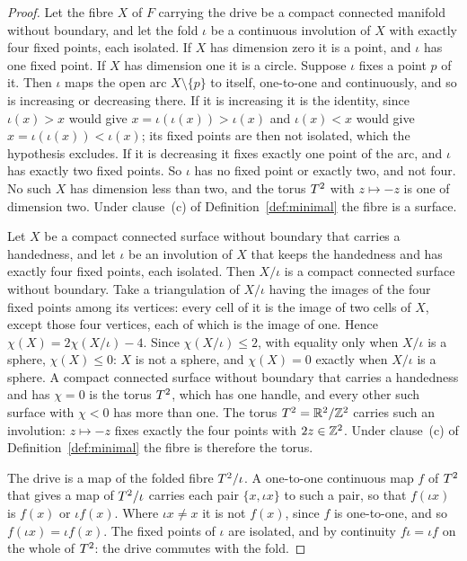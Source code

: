 \documentclass[11pt,a4paper]{article}
\theoremstyle{plain}
\theoremstyle{definition}
\theoremstyle{remark}
\begin{document}
\begin{proof}
Let the fibre $X$ of $F$ carrying the drive be a compact connected manifold without boundary, and let the fold $\iota$ be a continuous involution of $X$ with exactly four fixed points, each isolated. If $X$ has dimension zero it is a point, and $\iota$ has one fixed point. If $X$ has dimension one it is a circle. Suppose $\iota$ fixes a point $p$ of it. Then $\iota$ maps the open arc $X\setminus\{p\}$ to itself, one-to-one and continuously, and so is increasing or decreasing there. If it is increasing it is the identity, since $\iota(x)>x$ would give $x=\iota(\iota(x))>\iota(x)$ and $\iota(x)<x$ would give $x=\iota(\iota(x))<\iota(x)$; its fixed points are then not isolated, which the hypothesis excludes. If it is decreasing it fixes exactly one point of the arc, and $\iota$ has exactly two fixed points. So $\iota$ has no fixed point or exactly two, and not four. No such $X$ has dimension less than two, and the torus $T^2$ with $z\mapsto-z$ is one of dimension two. Under clause~(c) of Definition~\ref{def:minimal} the fibre is a surface.

Let $X$ be a compact connected surface without boundary that carries a handedness, and let $\iota$ be an involution of $X$ that keeps the handedness and has exactly four fixed points, each isolated. Then $X/\iota$ is a compact connected surface without boundary. Take a triangulation of $X/\iota$ having the images of the four fixed points among its vertices: every cell of it is the image of two cells of $X$, except those four vertices, each of which is the image of one. Hence $\chi(X)=2\chi(X/\iota)-4$. Since $\chi(X/\iota)\le2$, with equality only when $X/\iota$ is a sphere, $\chi(X)\le0$: $X$ is not a sphere, and $\chi(X)=0$ exactly when $X/\iota$ is a sphere. A compact connected surface without boundary that carries a handedness and has $\chi=0$ is the torus $T^2$, which has one handle, and every other such surface with $\chi<0$ has more than one. The torus $T^2=\mathbb{R}^{2}/\mathbb{Z}^{2}$ carries such an involution: $z\mapsto-z$ fixes exactly the four points with $2z\in\mathbb{Z}^{2}$. Under clause~(c) of Definition~\ref{def:minimal} the fibre is therefore the torus.

The drive is a map of the folded fibre $T^2/\iota$. A one-to-one continuous map $f$ of $T^2$ that gives a map of $T^2/\iota$ carries each pair $\{x,\iota x\}$ to such a pair, so that $f(\iota x)$ is $f(x)$ or $\iota f(x)$. Where $\iota x\neq x$ it is not $f(x)$, since $f$ is one-to-one, and so $f(\iota x)=\iota f(x)$. The fixed points of $\iota$ are isolated, and by continuity $f\iota=\iota f$ on the whole of $T^2$: the drive commutes with the fold.


\end{proof}
\end{document}
